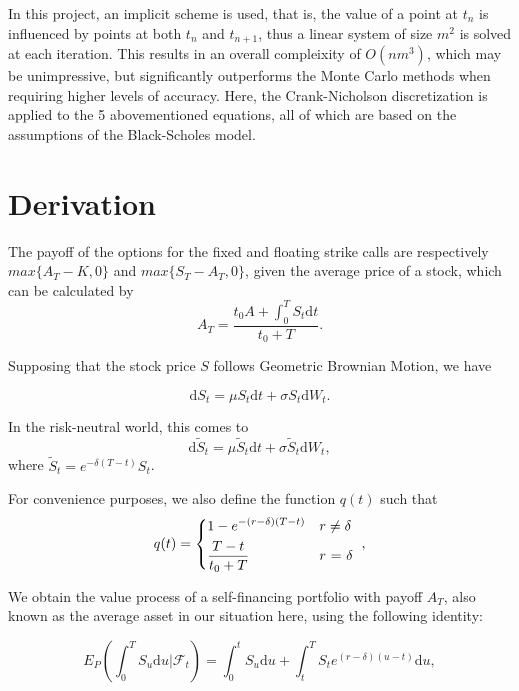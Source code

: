 \documentclass{article}
\begin{document}
In this project, an implicit scheme is used, that is, the value of a point at \(t_n\) is influenced by points at both \(t_n\) and \(t_{n+1}\), thus a linear system of size \(m^2\) is solved at each iteration. This results in an overall compleixity of \(O(nm^3)\), which may be unimpressive, but significantly outperforms the Monte Carlo methods when requiring higher levels of accuracy. Here, the Crank-Nicholson discretization is applied to the 5 abovementioned equations, all of which are based on the assumptions of the Black-Scholes model.

\section{Derivation}

The payoff of the options for the fixed and floating strike calls are respectively \(max\{A_T - K, 0\}\) and \(max\{S_T - A_T, 0\}\), given the average price of a stock, which can be calculated by
\begin{equation}
  A_T = \frac{t_0A + \int_0^T S_t \mathrm{d}t}{t_0 + T}.
\end{equation}

Supposing that the stock price \(S\) follows Geometric Brownian Motion, we have

\begin{equation}
  \mathrm{d}S_t = \mu S_t \mathrm{d}t + \sigma S_t \mathrm{d}W_t.
\end{equation}

In the risk-neutral world, this comes to
\begin{equation}
  \mathrm{d}\tilde{S}_t = \mu \tilde{S}_t \mathrm{d}t + \sigma \tilde{S}_t \mathrm{d}W_t,
\end{equation}
where \(\tilde{S}_t = e^{-\delta(T-t)}S_t\).

For convenience purposes, we also define the function \(q(t)\) such that
\begin{equation}
  q(t) =
  \begin{dcases*}
    1 - e^{-(r-\delta)(T-t)} & \(r \neq \delta\) \\
    \frac{T-t}{t_0 + T} & \(r\) = \(\delta\)
  \end{dcases*},
\end{equation}

We obtain the value process of a self-financing portfolio with payoff \(A_T\), also known as the average asset in our situation here, using the following identity:

\begin{equation}
  E_P(\int_0^TS_u\textrm{d}u | \mathcal{F}_t) = \int_0^t S_u \textrm{d}u + \int_t^T S_te^{(r-\delta)(u-t)}\textrm{d}u,
\end{equation}
\end{document}
